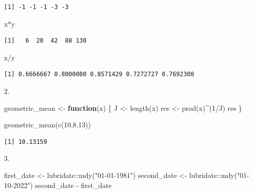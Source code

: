 \documentclass[
  letterpaper,
  DIV=11,
  numbers=noendperiod]{scrreprt}
\newenvironment{Shaded}{\begin{snugshade}}{\end{snugshade}}
\newcommand{\ControlFlowTok}[1]{\textcolor[rgb]{0.00,0.23,0.31}{\textbf{#1}}}
\newcommand{\DecValTok}[1]{\textcolor[rgb]{0.68,0.00,0.00}{#1}}
\newcommand{\FunctionTok}[1]{\textcolor[rgb]{0.28,0.35,0.67}{#1}}
\newcommand{\NormalTok}[1]{\textcolor[rgb]{0.00,0.23,0.31}{#1}}
\newcommand{\OtherTok}[1]{\textcolor[rgb]{0.00,0.23,0.31}{#1}}
\newcommand{\SpecialCharTok}[1]{\textcolor[rgb]{0.37,0.37,0.37}{#1}}
\newcommand{\StringTok}[1]{\textcolor[rgb]{0.13,0.47,0.30}{#1}}
\begin{document}
\begin{verbatim}
[1] -1 -1 -1 -3 -3
\end{verbatim}

\begin{Shaded}
\begin{Highlighting}[]
\NormalTok{x}\SpecialCharTok{*}\NormalTok{y}
\end{Highlighting}
\end{Shaded}

\begin{verbatim}
[1]   6  20  42  88 130
\end{verbatim}

\begin{Shaded}
\begin{Highlighting}[]
\NormalTok{x}\SpecialCharTok{/}\NormalTok{y}
\end{Highlighting}
\end{Shaded}

\begin{verbatim}
[1] 0.6666667 0.8000000 0.8571429 0.7272727 0.7692308
\end{verbatim}

2.

\begin{Shaded}
\begin{Highlighting}[]
\NormalTok{geometric\_mean }\OtherTok{\textless{}{-}} \ControlFlowTok{function}\NormalTok{(x) \{}
\NormalTok{  J }\OtherTok{\textless{}{-}} \FunctionTok{length}\NormalTok{(x)}
\NormalTok{  res }\OtherTok{\textless{}{-}} \FunctionTok{prod}\NormalTok{(x)}\SpecialCharTok{\^{}}\NormalTok{(}\DecValTok{1}\SpecialCharTok{/}\NormalTok{J)}
\NormalTok{  res}
\NormalTok{\}}

\FunctionTok{geometric\_mean}\NormalTok{(}\FunctionTok{c}\NormalTok{(}\DecValTok{10}\NormalTok{,}\DecValTok{8}\NormalTok{,}\DecValTok{13}\NormalTok{))}
\end{Highlighting}
\end{Shaded}

\begin{verbatim}
[1] 10.13159
\end{verbatim}

3.

\begin{Shaded}
\begin{Highlighting}[]
\NormalTok{first\_date }\OtherTok{\textless{}{-}}\NormalTok{ lubridate}\SpecialCharTok{::}\FunctionTok{mdy}\NormalTok{(}\StringTok{"01{-}01{-}1981"}\NormalTok{)}
\NormalTok{second\_date }\OtherTok{\textless{}{-}}\NormalTok{ lubridate}\SpecialCharTok{::}\FunctionTok{mdy}\NormalTok{(}\StringTok{"01{-}10{-}2022"}\NormalTok{)}
\NormalTok{second\_date }\SpecialCharTok{{-}}\NormalTok{ first\_date}
\end{Highlighting}
\end{Shaded}
\end{document}
